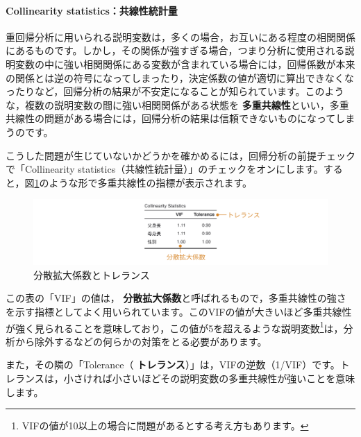 \documentclass[
  12pt,
  a5jpaper,
  lualatex, ja=standard]{bxjsbook}
\renewcommand{\emph}[1]{\textbf{\color{emph} #1}}
\begin{document}
\hypertarget{collinearity-statisticsux5171ux7ddaux6027ux7d71ux8a08ux91cf}{%
\paragraph*{Collinearity statistics：共線性統計量}\label{collinearity-statisticsux5171ux7ddaux6027ux7d71ux8a08ux91cf}}

重回帰分析に用いられる説明変数は，多くの場合，お互いにある程度の相関関係にあるものです。しかし，その関係が強すぎる場合，つまり分析に使用される説明変数の中に強い相関関係にある変数が含まれている場合には，回帰係数が本来の関係とは逆の符号になってしまったり，決定係数の値が適切に算出できなくなったりなど，回帰分析の結果が不安定になることが知られています。このような，複数の説明変数の間に強い相関関係がある状態を\emph{多重共線性}といい，多重共線性の問題がある場合には，回帰分析の結果は信頼できないものになってしまうのです。

こうした問題が生じていないかどうかを確かめるには，回帰分析の前提チェックで「Collinearity statistics（共線性統計量）」のチェックをオンにします。すると，図\ref{fig:regression-lr-assumption-colin}のような形で多重共線性の指標が表示されます。

\begin{figure}[!ht]

{\centering \includegraphics[width=1\linewidth]{images/regression/lr-assumption-colin} 

}

\caption{分散拡大係数とトレランス}\label{fig:regression-lr-assumption-colin}
\end{figure}

この表の「VIF」の値は，\emph{分散拡大係数}と呼ばれるもので，多重共線性の強さを示す指標としてよく用いられています。このVIFの値が大きいほど多重共線性が強く見られることを意味しており，この値が5を超えるような説明変数\footnote{VIFの値が10以上の場合に問題があるとする考え方もあります。}は，分析から除外するなどの何らかの対策をとる必要があります。

また，その隣の「Tolerance（\emph{トレランス}）」は，VIFの逆数（1/VIF）です。トレランスは，小さければ小さいほどその説明変数の多重共線性が強いことを意味します。
\end{document}
